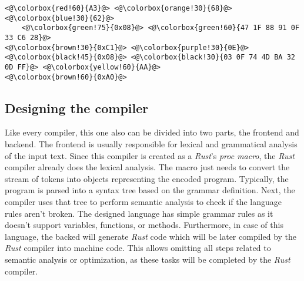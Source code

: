 \begin{minipage}{\linewidth}
\begin{lstlisting}[caption={Example test case},label={tc}]
<@\colorbox{red!60}{A3}@> <@\colorbox{orange!30}{68}@> <@\colorbox{blue!30}{62}@> 
    <@\colorbox{green!75}{0x08}@> <@\colorbox{green!60}{47 1F 88 91 0F 33 C6 28}@> 
<@\colorbox{brown!30}{0xC1}@> <@\colorbox{purple!30}{0E}@> <@\colorbox{black!45}{0x08}@> <@\colorbox{black!30}{03 0F 74 4D BA 32 0D FF}@> <@\colorbox{yellow!60}{AA}@> 
<@\colorbox{brown!60}{0xA0}@>
\end{lstlisting}
\end{minipage}

\subsection{Designing the compiler} \label{sec:compiler}
Like every compiler, this one also can be divided into two parts, the frontend and backend. The frontend is usually responsible for lexical and grammatical analysis of the input text. Since this compiler is created as a \textit{Rust}'s \textit{proc macro}, the \textit{Rust} compiler already does the lexical analysis. The macro just needs to convert the stream of tokens into objects representing the encoded program. Typically, the program is parsed into a syntax tree based on the grammar definition. Next, the compiler uses that tree to perform semantic analysis to check if the language rules aren't broken. The designed language has simple grammar rules as it doesn't support variables, functions, or methods. Furthermore, in case of this language, the backed will generate \textit{Rust} code which will be later compiled by the \textit{Rust} compiler into machine code. This allows omitting all steps related to semantic analysis or optimization, as these tasks will be completed by the \textit{Rust} compiler. 

